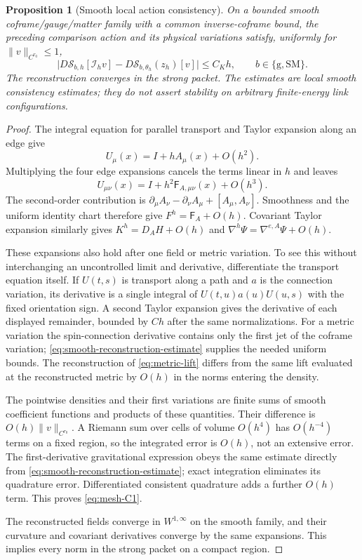 \documentclass[11pt]{article}
\numberwithin{equation}{section}
\newtheorem{proposition}[proposition]{Proposition}
\theoremstyle{definition}
\theoremstyle{remark}
\newcommand{\norm}[1]{\lVert#1\rVert}
\newcommand{\abs}[1]{\lvert#1\rvert}
\newcommand{\Sact}{\mathscr S}
\newcommand{\Fcurv}{\mathsf F}
\begin{document}
\begin{proposition}[Smooth local action consistency]
\label{prop:mesh-consistency}
On a bounded smooth coframe/gauge/matter family with a common inverse-coframe bound, the preceding comparison action and its physical variations satisfy, uniformly for $\norm v_{C^{r_0}}\le1$,
\begin{equation}
 \abs{D\Sact_{b,h}[\mathcal I_hv]
       -D\Sact_{b,\theta_h}(z_h)[v]}\le C_Kh,
 \qquad b\in\{\mathrm g,\mathrm{SM}\}.
 \label{eq:mesh-C1}
\end{equation}
The reconstruction converges in the strong packet. The estimates are local smooth consistency estimates; they do not assert stability on arbitrary finite-energy link configurations.
\end{proposition}
\begin{proof}
The integral equation for parallel transport and Taylor expansion along an edge give
\[
 U_\mu(x)=I+hA_\mu(x)+O(h^2).
\]
Multiplying the four edge expansions cancels the terms linear in $h$ and leaves
\[
 U_{\mu\nu}(x)=I+h^2\Fcurv_{A,\mu\nu}(x)+O(h^3).
\]
The second-order contribution is $\partial_\mu A_\nu-\partial_\nu A_\mu+[A_\mu,A_\nu]$. Smoothness and the uniform identity chart therefore give $F^h=\Fcurv_A+O(h)$. Covariant Taylor expansion similarly gives $K^h=D_AH+O(h)$ and $\nabla^h\Psi=\nabla^{e,A}\Psi+O(h)$.

These expansions also hold after one field or metric variation. To see this without interchanging an uncontrolled limit and derivative, differentiate the transport equation itself. If $U(t,s)$ is transport along a path and $a$ is the connection variation, its derivative is a single integral of $U(t,u)a(u)U(u,s)$ with the fixed orientation sign. A second Taylor expansion gives the derivative of each displayed remainder, bounded by $Ch$ after the same normalizations. For a metric variation the spin-connection derivative contains only the first jet of the coframe variation; \eqref{eq:smooth-reconstruction-estimate} supplies the needed uniform bounds. The reconstruction of \eqref{eq:metric-lift} differs from the same lift evaluated at the reconstructed metric by $O(h)$ in the norms entering the density.

The pointwise densities and their first variations are finite sums of smooth coefficient functions and products of these quantities. Their difference is $O(h)\norm v_{C^{r_0}}$. A Riemann sum over cells of volume $O(h^4)$ has $O(h^{-4})$ terms on a fixed region, so the integrated error is $O(h)$, not an extensive error. The first-derivative gravitational expression obeys the same estimate directly from \eqref{eq:smooth-reconstruction-estimate}; exact integration eliminates its quadrature error. Differentiated consistent quadrature adds a further $O(h)$ term. This proves \eqref{eq:mesh-C1}.

The reconstructed fields converge in $W^{1,\infty}$ on the smooth family, and their curvature and covariant derivatives converge by the same expansions. This implies every norm in the strong packet on a compact region.
\end{proof}
\end{document}
